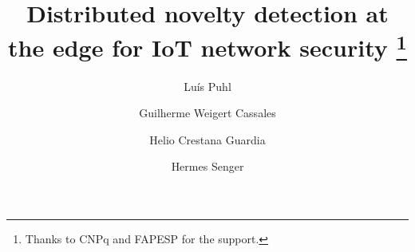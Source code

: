 \documentclass[runningheads]{lib/llncs}
\begin{document}
\title{
Distributed novelty detection at the edge for IoT network security
\thanks{Thanks to CNPq and  FAPESP for the support.}}

\author{
  Luís Puhl \and
  Guilherme Weigert Cassales  \and
  Helio Crestana Guardia
  \and
  Hermes Senger
}

\maketitle






\end{document}

